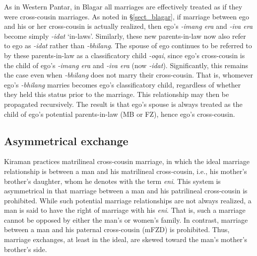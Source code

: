 As in Western Pantar, in Blagar all marriages are effectively treated as if they were cross-cousin marriages. As noted in {\S}\ref{sect_blagar}, if marriage between ego and his or her cross-cousin is actually realized, then ego's \textit{-imang era} and \textit{-iva era} become simply \textit{-idat} `in-laws'. Similarly, these new parents-in-law now also refer to ego as \textit{-idat} rather than \textit{-bhilang}. The spouse of ego continues to be referred to by these parents-in-law as a classificatory child \textit{-oqai}, since ego's cross-cousin is the child of ego's \textit{-imang era} and \textit{-iva era} (now \textit{-idat}). Significantly, this remains the case even when \textit{-bhilang} does not marry their cross-cousin. That is, whomever ego's \textit{-bhilang} marries becomes ego's classificatory child, regardless of whether they held this status prior to the marriage. This relationship may then be propagated recursively. The result is that ego's spouse is always treated as the child of ego's potential parents-in-law (MB or FZ), hence ego's cross-cousin.

\subsection{Asymmetrical exchange}
\label{bkm:Ref247334472}Kiraman practices matrilineal cross-cousin marriage, in which the ideal marriage relationship is between a man and his matrilineal cross-cousin, i.e., his mother's brother's daughter, whom he denotes with the term \textit{eni}. This system is asymmetrical in that marriage between a man and his patrilineal cross-cousin is prohibited. While such potential marriage relationships are not always realized, a man is said to have the right of marriage with his \textit{eni}. That is, such a marriage cannot be opposed by either the man's or women's family. In contrast, marriage between a man and his paternal cross-cousin (mFZD) is prohibited. Thus, marriage exchanges, at least in the ideal, are skewed toward the man's mother's brother's side.

